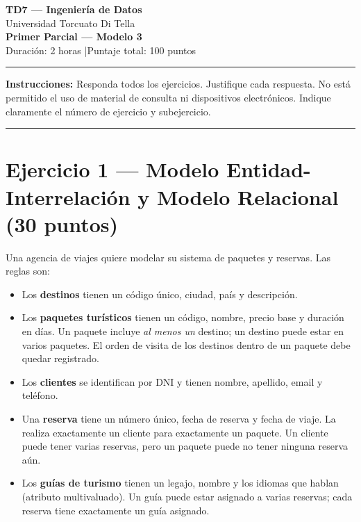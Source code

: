 \documentclass[11pt,a4paper]{article}
\begin{document}
\begin{center}
  {\LARGE\bfseries TD7 — Ingeniería de Datos}\\[6pt]
  {\large Universidad Torcuato Di Tella}\\[4pt]
  {\Large\bfseries Primer Parcial — Modelo 3}\\[4pt]
  {\normalsize Duración: 2 horas \quad|\quad Puntaje total: 100 puntos}
\end{center}
\noindent\rule{\linewidth}{0.8pt}
\vspace{2pt}

\noindent\textbf{Instrucciones:} Responda todos los ejercicios. Justifique cada respuesta. No está permitido el uso de material de consulta ni dispositivos electrónicos. Indique claramente el número de ejercicio y subejercicio.

\vspace{6pt}
\noindent\rule{\linewidth}{0.4pt}

\section*{Ejercicio 1 — Modelo Entidad-Interrelación y Modelo Relacional \hfill\normalfont(30 puntos)}

Una agencia de viajes quiere modelar su sistema de paquetes y reservas. Las reglas son:

\begin{itemize}
  \item Los \textbf{destinos} tienen un código único, ciudad, país y descripción.
  \item Los \textbf{paquetes turísticos} tienen un código, nombre, precio base y duración en días. Un paquete incluye \emph{al menos un} destino; un destino puede estar en varios paquetes. El orden de visita de los destinos dentro de un paquete debe quedar registrado.
  \item Los \textbf{clientes} se identifican por DNI y tienen nombre, apellido, email y teléfono.
  \item Una \textbf{reserva} tiene un número único, fecha de reserva y fecha de viaje. La realiza exactamente un cliente para exactamente un paquete. Un cliente puede tener varias reservas, pero un paquete puede no tener ninguna reserva aún.
  \item Los \textbf{guías de turismo} tienen un legajo, nombre y los idiomas que hablan (atributo multivaluado). Un guía puede estar asignado a varias reservas; cada reserva tiene exactamente un guía asignado.
\end{itemize}
\end{document}
